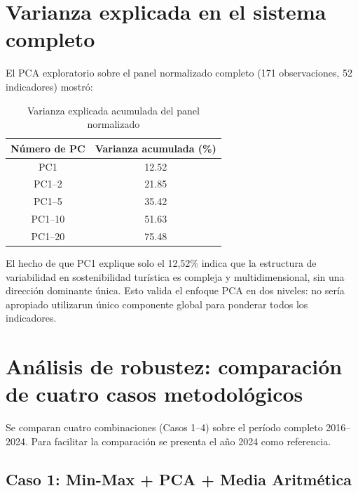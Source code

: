 \section{Varianza explicada en el sistema completo}

El PCA exploratorio sobre el panel normalizado completo (171 observaciones, 52 indicadores) mostró:

\begin{table}[H]
    \centering
    \small
    \begin{tabular}{cc}
        \toprule
        \textbf{Número de PC} & \textbf{Varianza acumulada (\%)} \\
        \midrule
        PC1 & 12.52 \\
        PC1--2 & 21.85 \\
        PC1--5 & 35.42 \\
        PC1--10 & 51.63 \\
        PC1--20 & 75.48 \\
        \bottomrule
    \end{tabular}
    \caption{Varianza explicada acumulada del panel normalizado}
    \label{tab:var_acumulada}
\end{table}

El hecho de que PC1 explique solo el 12,52\% indica que la estructura de variabilidad en sostenibilidad turística es compleja y multidimensional, sin una dirección dominante única. Esto valida el enfoque PCA en dos niveles: no sería apropiado utilizarun único componente global para ponderar todos los indicadores.

\section{Análisis de robustez: comparación de cuatro casos metodológicos}

Se comparan cuatro combinaciones (Casos 1--4) sobre el período completo 2016--2024. Para facilitar la comparación se presenta el año 2024 como referencia.

\subsection{Caso 1: Min-Max + PCA + Media Aritmética}

